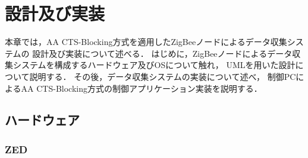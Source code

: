 \documentclass[12pt]{jreport}
\begin{document}


\chapter{設計及び実装}
\label{imple}

本章では，AA CTS-Blocking方式を適用したZigBeeノードによるデータ収集システムの
設計及び実装について述べる．
はじめに，ZigBeeノードによるデータ収集システムを構成するハードウェア及びOSについて触れ，
UMLを用いた設計について説明する．
その後，データ収集システムの実装について述べ，
制御PCによるAA CTS-Blocking方式の制御アプリケーション実装を説明する．

\section{ハードウェア}

\subsection{ZED}
\end{document}
